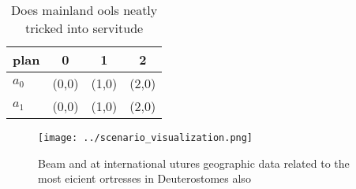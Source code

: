 \documentclass[a4paper]{article}
\begin{document}
\begin{table}
\begin{adjustbox}{width=0.6\columnwidth}
\begin{tabular}{|l|l|l|l|}
\hline
\textbf{plan} & \multicolumn{1}{c|}{\textbf{0}} & \multicolumn{1}{c|}{\textbf{1}} & \multicolumn{1}{c|}{\textbf{2}} \\ \hline
\textbf{$a_0$}  & (0,0) & (1,0) & (2,0) \\ \hline
\textbf{$a_1$}  & (0,0) & (1,0) & (2,0) \\ \hline
\end{tabular}
\end{adjustbox}
\caption{Does mainland ools neatly tricked into servitude 
}
\end{table}

\begin{figure}
\centering
\texttt{[image: ../scenario\_visualization.png]}
\caption{Beam and at international utures geographic data related to the most eicient ortresses in Deuterostomes also 
}
\end{figure}
 
\end{document}
